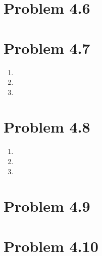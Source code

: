 \documentclass{article}
\begin{document}
\section*{Problem 4.6}

\section*{Problem 4.7}
\begin{enumerate}[label=(\alph*)]
  \item 
  \item 
  \item 
\end{enumerate}

\section*{Problem 4.8}
\begin{enumerate}[label=(\alph*)]
  \item 
  \item 
  \item 
\end{enumerate}

\section*{Problem 4.9}

\section*{Problem 4.10}
\end{document}
